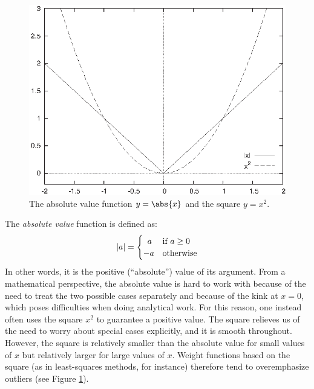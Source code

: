 \begin{figure}
  \centerline{\includegraphics{img/absvalue}}
  \caption{The absolute value function $y = \abs{x}$ and the square $y
    = x^2$.}
  \label{fig:absvalue}
\end{figure} 

The \emph{absolute value} function is defined as: 
%
\[
|a| = 
\begin{cases} 
  \enskip a & \text{if $a \ge 0$} \\
  -a & \text{otherwise}
\end{cases}
\]
%
In other words, it is the positive (``absolute'') value of its
argument. From a mathematical perspective, the absolute value is hard
to work with because of the need to treat the two possible cases
separately and because of the kink at $x=0$, which poses difficulties
when doing analytical work.  For this reason, one instead often uses
the square $x^2$ to guarantee a positive value.  The square relieves
us of the need to worry about special cases explicitly, and it is
smooth throughout. However, the square is relatively smaller than the
absolute value for small values of $x$ but relatively larger for large
values of $x$. Weight functions  based on the square (as in
least-squares methods, for instance) therefore tend to overemphasize
outliers (see Figure \ref{fig:absvalue}).



